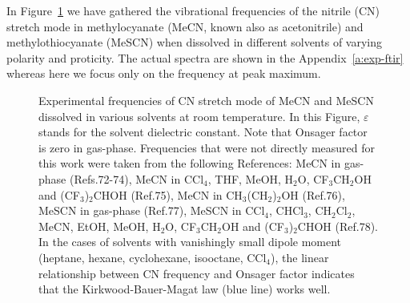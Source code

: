 \documentclass[a4paper,titlepage,twoside,fleqn,12pt]{book}
\begin{document}
\begin{refsection}
In Figure~\ref{f.MeCN.MeSCN.vs.solvents} we have gathered the vibrational 
frequencies of the nitrile (CN) stretch mode in methylocyanate (MeCN, known also as acetonitrile) and methylothiocyanate
(MeSCN) when dissolved in different solvents of varying polarity and proticity.\citep{Blasiak.Ritchie.Webb.Cho.XXX.2016}
The actual spectra are shown in the Appendix~\ref{a:exp-ftir} whereas here we focus only
on the frequency at peak maximum.
%
\begin{figure}[ht]
\centering
\setlength\fboxsep{0.4pt}
\setlength\fboxrule{0.5pt}
\caption{Experimental frequencies of CN stretch mode of MeCN and MeSCN dissolved in
various solvents at room temperature. In this Figure, $\varepsilon$
stands for the solvent dielectric constant. Note that Onsager factor is zero in gas-phase. 
Frequencies that were not directly measured for this work were taken from the following 
References: MeCN in gas-phase (Refs.72-74), MeCN in CCl$_4$, THF, MeOH, H$_2$O, CF$_3$CH$_2$OH and 
(CF$_3$)$_2$CHOH (Ref.75), MeCN in CH$_3$(CH$_2$)$_2$OH (Ref.76), MeSCN in gas-phase (Ref.77), MeSCN in 
CCl$_4$, CHCl$_3$, CH$_2$Cl$_2$, MeCN, EtOH, MeOH, H$_2$O, CF$_3$CH$_2$OH and (CF$_3$)$_2$CHOH (Ref.78). In the 
cases of solvents with vanishingly small dipole moment (heptane, hexane, cyclohexane, 
isooctane, CCl$_4$), the linear relationship between CN frequency and Onsager factor indicates that 
the Kirkwood-Bauer-Magat law (blue line) works well.
\label{f.MeCN.MeSCN.vs.solvents}}
\end{figure}
%


\end{refsection}
\end{document}

